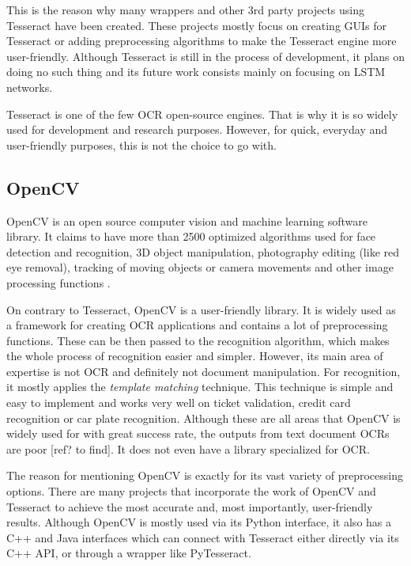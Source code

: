 This is the reason why many wrappers and other 3rd party projects using Tesseract have been created. These projects mostly focus on creating GUIs for Tesseract or adding preprocessing algorithms to make the Tesseract engine more user-friendly. Although Tesseract is still in the process of development, it plans on doing no such thing and its future work consists mainly on focusing on LSTM networks.

Tesseract is one of the few OCR open-source engines. That is why it is so widely used for development and research purposes. However, for quick, everyday and user-friendly purposes, this is not the choice to go with.

\subsection{OpenCV}

OpenCV is an open source computer vision and machine learning software library. It claims to have more than 2500 optimized algorithms used for face detection and recognition, 3D object manipulation, photography editing (like red eye removal), tracking of moving objects or camera movements and other image processing functions \citep{OpenCV}.

On contrary to Tesseract, OpenCV is a user-friendly library. It is widely used as a framework for creating OCR applications and contains a lot of preprocessing functions. These can be then passed to the recognition algorithm, which makes the whole process of recognition easier and simpler. However, its main area of expertise is not OCR and definitely not document manipulation. For recognition, it mostly applies the \emph{template matching} technique. This technique is simple and easy to implement and works very well on ticket validation, credit card recognition or car plate recognition. Although these are all areas that OpenCV is widely used for with great success rate, the outputs from text document OCRs are poor [ref? to find]. It does not even have a library specialized for OCR.

The reason for mentioning OpenCV is exactly for its vast variety of preprocessing options. There are many projects that incorporate the work of OpenCV and Tesseract to achieve the most accurate and, most importantly, user-friendly results. Although OpenCV is mostly used via its Python interface, it also has a C++ and Java interfaces which can connect with Tesseract either directly via its C++ API, or through a wrapper like PyTesseract.

